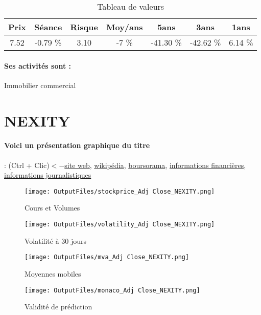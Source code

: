 \documentclass[11pt,a4paper]{report}%
\begin{document}
\begin{table}[H]
  \centering
    \begin{tabular}{|c|c|c|c|c|c|c|}
    \hline
    Prix & Séance & Risque  & Moy/ans & 5ans & 3ans & 1ans \\
    \hline
    7.52 &    -0.79 \%    & 3.10 & -7 \% & -41.30 \% & -42.62 \% & 6.14 \% \\
    \hline
    \end{tabular}%
        \label{tab:table_MERCIALYS}%
      \caption{Tableau de valeurs}
\end{table}%

\paragraph{Ses activités sont : } Immobilier commercial  
    
    \newpage

\section{NEXITY}

\paragraph{Voici un présentation graphique du titre} : (Ctrl + Clic)$<-$\href{https://www.nexity.fr/groupe/finance}{site web}, \href{https://fr.wikipedia.org/wiki/Nexity}{wikipédia}, \href{https://www.boursorama.com/cours/1rPNXI}{boursorama}, \href{https://www.qwant.com/?q=site:https:%2f%2fwww.easybourse.com%2faction-societe%2fNEXITY&t=web&client=ext-firefox-hp}{informations financières}, \href{https://bourse.lerevenu.com/cours-de-bourse/fiche-valeur-synthese/NEXITY/NXI-FR}{informations journalistiques}
\begin{figure}[!htb]
   \begin{minipage}{0.5\textwidth}
     \centering
     \texttt{[image: OutputFiles/stockprice\_Adj Close\_NEXITY.png]}
     \caption{Cours et Volumes}\label{Fig:price_NEXITY}
   \end{minipage}\hfill
   \begin{minipage}{0.5\textwidth}
     \centering
     \texttt{[image: OutputFiles/volatility\_Adj Close\_NEXITY.png]}
     \caption{Volatilité à 30 jours}\label{Fig:volat_NEXITY}
   \end{minipage}
\end{figure}
\begin{figure}[!htb]
   \begin{minipage}{0.5\textwidth}
     \centering
     \texttt{[image: OutputFiles/mva\_Adj Close\_NEXITY.png]}
     \caption{Moyennes mobiles}\label{Fig:mva_NEXITY}
   \end{minipage}\hfill
   \begin{minipage}{0.5\textwidth}
     \centering
     \texttt{[image: OutputFiles/monaco\_Adj Close\_NEXITY.png]}
     \caption{Validité de prédiction}\label{Fig:prediction_NEXITY}
   \end{minipage}
\end{figure}
\end{document}
